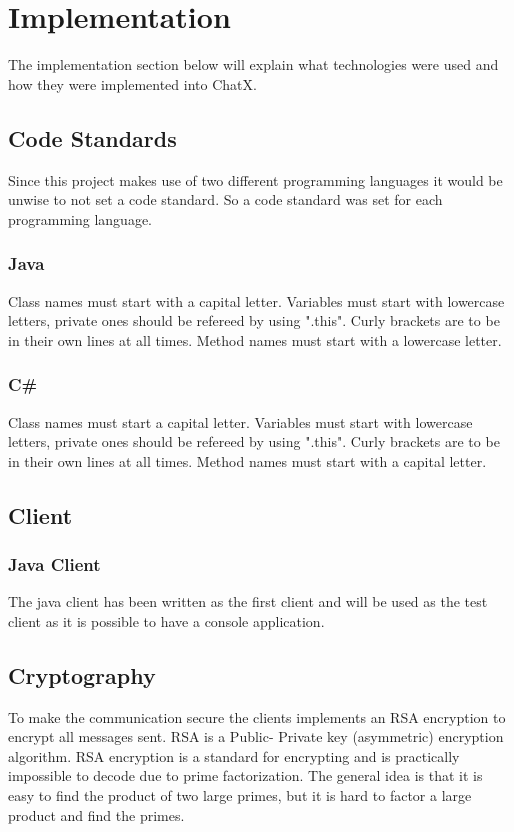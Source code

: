 \chapter{Implementation}

The implementation section below will explain what technologies were used and how they were implemented into ChatX.

\section{Code Standards}
Since this project makes use of two different programming languages it would be unwise to not set a code standard. So a code standard was set for each programming language.

\subsection{Java}
Class names must start with a capital letter.
Variables must start with lowercase letters, private ones should be refereed by using ".this".
Curly brackets are to be in their own lines at all times.
Method names must start with a lowercase letter.


\subsection{C\#}
Class names must start a capital letter.
Variables must start with lowercase letters, private ones should be refereed by using ".this".
Curly brackets are to be in their own lines at all times.
Method names must start with a capital letter.

\section{Client}

\subsection{Java Client}

The java client has been written as the first client and will be used as the test client as it is possible to have a console application.

\section{Cryptography}

To make the communication secure the clients implements an RSA encryption to encrypt all messages sent. RSA is a Public- Private key (asymmetric) encryption algorithm. RSA encryption is a standard for encrypting and is practically impossible to decode due to prime factorization. The general idea is that it is easy to find the product of two large primes, but it is hard to factor a large product and find the primes.

